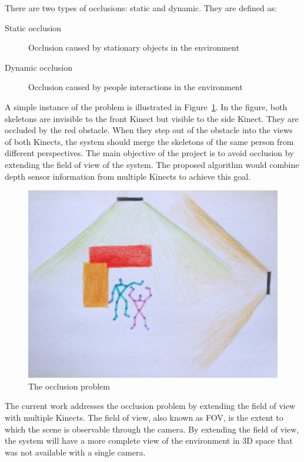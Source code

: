 There are two types of occlusions: static and dynamic. They are defined as:

\begin{description}
  \item[Static occlusion] Occlusion caused by stationary objects in the environment 
  \item[Dynamic occlusion] Occlusion caused by people interactions in the environment
\end{description}

A simple instance of the problem is illustrated in Figure~\ref{fig:occlusion_problem}. In the figure, both skeletons are invisible to the front Kinect but visible to the side Kinect. They are occluded by the red obstacle. When they step out of the obstacle into the views of both Kinects, the system should merge the skeletons of the same person from different perspectives. The main objective of the project is to avoid occlusion by extending the field of view of the system. The proposed algorithm would combine depth sensor information from multiple Kinects to achieve this goal.

\begin{figure}[!h]
  \centering
  \includegraphics[width=0.8\linewidth]{figs/occlusion_problem}
  \caption{The occlusion problem}
  \label{fig:occlusion_problem}
\end{figure}

The current work addresses the occlusion problem by extending the field of view with multiple Kinects. The field of view, also known as FOV, is the extent to which the scene is observable through the camera. By extending the field of view, the system will have a more complete view of the environment in 3D space that was not available with a single camera.


